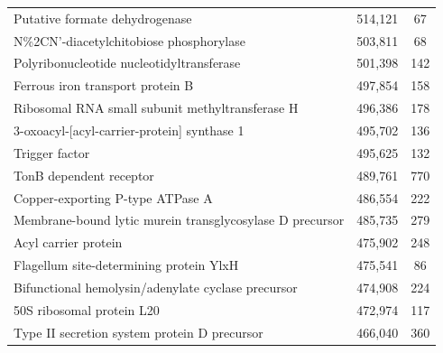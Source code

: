 \begin{singlespace}
\begin{longtable}{p{} cc}
                                                            Putative formate dehydrogenase &                     514,121 &            67 \\
                                                   N\%2CN'-diacetylchitobiose phosphorylase &                     503,811 &            68 \\
                                                 Polyribonucleotide nucleotidyltransferase &                     501,398 &           142 \\
                                                          Ferrous iron transport protein B &                     497,854 &           158 \\
                                           Ribosomal RNA small subunit methyltransferase H &                     496,386 &           178 \\
                                               3-oxoacyl-[acyl-carrier-protein] synthase 1 &                     495,702 &           136 \\
                                                                            Trigger factor &                     495,625 &           132 \\
                                                                   TonB dependent receptor &                     489,761 &           770 \\
                                                          Copper-exporting P-type ATPase A &                     486,554 &           222 \\
                                  Membrane-bound lytic murein transglycosylase D precursor &                     485,735 &           279 \\
                                                                      Acyl carrier protein &                     475,902 &           248 \\
                                                   Flagellum site-determining protein YlxH &                     475,541 &            86 \\
                                        Bifunctional hemolysin/adenylate cyclase precursor &                     474,908 &           224 \\
                                                                 50S ribosomal protein L20 &                     472,974 &           117 \\
                                              Type II secretion system protein D precursor &                     466,040 &           360 \\

\end{longtable}
\end{singlespace}
